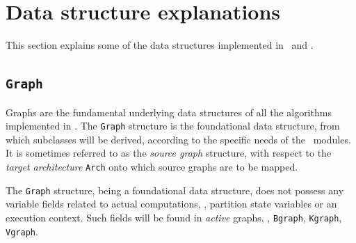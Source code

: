 
\section{Data structure explanations}
\label{sec-data}

This section explains some of the data structures implemented in
\scotch\ and \ptscotch.

\subsection{\texttt{Graph}}
\label{sec-data-graph}

Graphs are the fundamental underlying data structures of all the
algorithms implemented in \scotch. The \texttt{Graph} structure is the
foundational data structure, from which subclasses will be derived,
according to the specific needs of the \scotch\ modules. It is
sometimes referred to as the \textit{source graph} structure, with
respect to the \textit{target architecture} \texttt{Arch} onto which
source graphs are to be mapped.

The \texttt{Graph} structure, being a foundational data structure,
does not possess any variable fields related to actual computations,
\eg, partition state variables or an execution context. Such fields
will be found in \textit{active} graphs, \eg, \texttt{Bgraph},
\texttt{Kgraph}, \texttt{Vgraph}.


